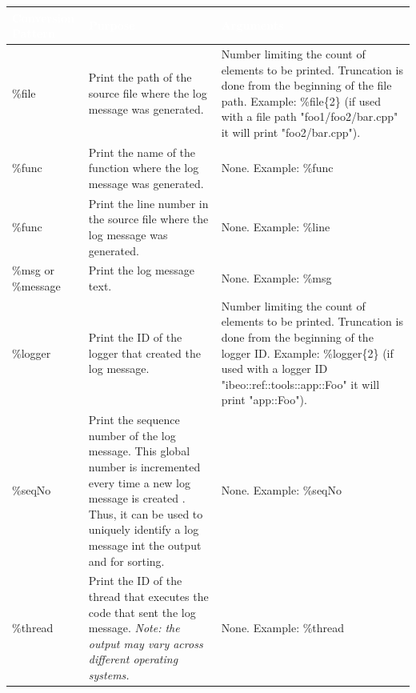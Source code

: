 \begin{table}[!htbp]
\begin{center}
\renewcommand{\arraystretch}{1.5}
\begin{tabularx}{\textwidth}{| p{} | p{} | X |}
\hline
\cellcolor{ibeo_red} \textcolor{white}{\textbf{Conversion Pattern}} & \cellcolor{ibeo_red} \textcolor{white}{\textbf{Purpose}} & \cellcolor{ibeo_red} \textcolor{white}{\textbf{Arguments}} \\


\hline
\%file & Print the path of the source file where the log message was generated. & 
Number limiting the count of elements to be printed. Truncation is done from the beginning of the file path.
\newline Example: \%file\{2\} (if used with a file path "foo1/foo2/bar.cpp" it will print "foo2/bar.cpp").
\\

\hline
\%func & Print the name of the function where the log message was generated. & 
None.
\newline Example: \%func
\\

\hline
\%func & Print the line number in the source file where the log message was generated. & 
None.
\newline Example: \%line
\\

\hline
\%msg or \%message & Print the log message text. & 
None.
\newline Example: \%msg
\\

\hline
\%logger & Print the ID of the logger that created the log message. & 
Number limiting the count of elements to be printed. Truncation is done from the beginning of the logger ID.
\newline Example: \%logger\{2\} (if used with a logger ID "ibeo::ref::tools::app::Foo" it will print "app::Foo").
\\

\hline
\%seqNo & Print the sequence number of the log message. This global number is incremented every time a new log message is created . Thus, it can be used to uniquely identify a log message int the output and for sorting. & 
None.
\newline Example: \%seqNo
\\

\hline
\%thread & Print the ID of the thread that executes the code that sent the log message. \textit{Note: the output may vary across different operating systems.} & 
None.
\newline Example: \%thread
\\

\hline
\end{tabularx}
\end{center}
\end{table}

